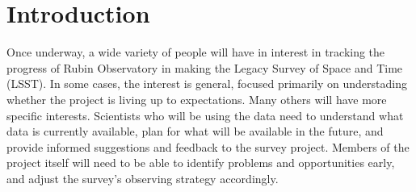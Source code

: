 
\section{Introduction}
\label{sec:org5b73239}

Once underway, a wide variety of people will have in interest in tracking the progress of Rubin Observatory in making the Legacy Survey of Space and Time (LSST).
In some cases, the interest is general, focused primarily on understading whether the project is living up to expectations.
Many others will have more specific interests.
Scientists who will be using the data need to understand what data is currently available, plan for what will be available in the future, and provide informed suggestions and feedback to the survey project. 
Members of the project itself will need to be able to identify problems and opportunities early, and adjust the survey's observing strategy accordingly.

